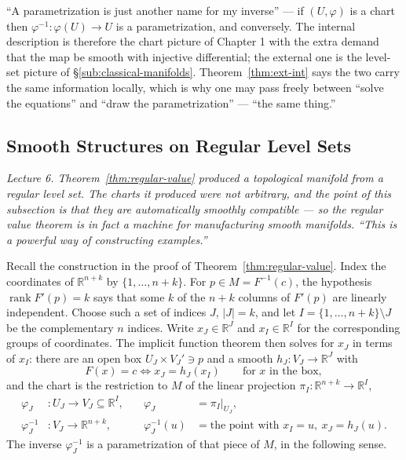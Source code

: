 \documentclass[11pt]{report}
\begin{document}
\begin{rembox}\label{rem:parametrization-inverse-chart}
``A parametrization is just another name for my inverse'' --- if $(U, \varphi)$ is a chart then $\varphi^{-1} : \varphi(U) \to U$ is a parametrization, and conversely. The internal description is therefore the chart picture of Chapter 1 with the extra demand that the map be smooth with injective differential; the external one is the level-set picture of \S\ref{sub:classical-manifolds}. Theorem~\ref{thm:ext-int} says the two carry the same information locally, which is why one may pass freely between ``solve the equations'' and ``draw the parametrization'' --- ``the same thing.''
\end{rembox}


\subsection{Smooth Structures on Regular Level Sets}\label{sub:level-smooth}

\textit{Lecture 6. Theorem~\ref{thm:regular-value} produced a \emph{topological} manifold from a regular level set. The charts it produced were not arbitrary, and the point of this subsection is that they are automatically smoothly compatible --- so the regular value theorem is in fact a machine for manufacturing smooth manifolds. ``This is a powerful way of constructing examples.''}

Recall the construction in the proof of Theorem~\ref{thm:regular-value}. Index the coordinates of $\mathbb{R}^{n+k}$ by $\{1, \ldots, n+k\}$. For $p \in M = F^{-1}(c)$, the hypothesis $\operatorname{rank} F'(p) = k$ says that some $k$ of the $n+k$ columns of $F'(p)$ are linearly independent. Choose such a set of indices $J$, $|J| = k$, and let $I = \{1,\ldots,n+k\} \setminus J$ be the complementary $n$ indices. Write $x_J \in \mathbb{R}^J$ and $x_I \in \mathbb{R}^I$ for the corresponding groups of coordinates. The implicit function theorem then solves for $x_J$ in terms of $x_I$: there are an open box $U_J \times V_J' \ni p$ and a smooth $h_J : V_J \to \mathbb{R}^J$ with
\[
F(x) = c \iff x_J = h_J(x_I) \qquad \text{for } x \text{ in the box},
\]
and the chart is the restriction to $M$ of the linear projection $\pi_I : \mathbb{R}^{n+k} \to \mathbb{R}^I$,
\[
\begin{aligned}
\varphi_J &: U_J \to V_J \subseteq \mathbb{R}^I, &\quad \varphi_J &= \pi_I|_{U_J}, \\
\varphi_J^{-1} &: V_J \to \mathbb{R}^{n+k}, &\quad \varphi_J^{-1}(u) &= \text{the point with } x_I = u,\ x_J = h_J(u).
\end{aligned}
\]
The inverse $\varphi_J^{-1}$ is a parametrization of that piece of $M$, in the following sense.
\end{document}

